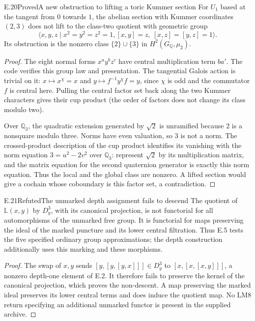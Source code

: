 \begin{statement}{E.20}{Proved}{A new obstruction to lifting a toric Kummer section}
For $U_1$ based at the tangent from $0$
towards $1$, the abelian section with
Kummer coordinates $(2,3)$ does not
lift to the class-two quotient with
geometric group
\[
 \langle x,y,z\mid x^2=y^2=z^2=1,
 [x,y]=z,\ [x,z]=[y,z]=1\rangle.
\]
Its obstruction is the nonzero class
$\{2\}\cup\{3\}$ in
$H^2(G_{\mathbb Q},\mu_2)$.
\end{statement}
\begin{proof}
The eight normal forms $x^a y^b z^c$
have central multiplication term
$b a'$. The code verifies this group
law and presentation. The tangential
Galois action is trivial on it:
$x\mapsto x^\chi=x$ and
$y\mapsto f^{-1}y^\chi f=y$, since
$\chi$ is odd and the commutator
$f$ is central here. Pulling the
central factor set back along the
two Kummer characters gives their
cup product (the order of factors
does not change its class modulo
two).

Over $\mathbb Q_3$, the quadratic
extension generated by $\sqrt2$ is
unramified because $2$ is a
nonsquare modulo three. Norms have
even valuation, so $3$ is not a
norm. The crossed-product
description of the cup product
identifies its vanishing with
the norm equation
$3=u^2-2v^2$ over $\mathbb Q_3$:
represent $\sqrt2$ by its
multiplication matrix, and the
matrix equation for the second
quaternion generator is exactly
this norm equation. Thus the
local and the global class are
nonzero. A lifted section would
give a cochain whose coboundary
is this factor set, a contradiction.
\end{proof}

\begin{statement}{E.21}{Refuted}{The unmarked depth assignment fails to descend}
The quotient of $\mathbb L(x,y)$
by $D_y^3$, with its canonical
projection, is not functorial for
all automorphisms of the unmarked
free group. It is functorial for
maps preserving the ideal of the
marked puncture and its lower
central filtration. Thus E.5
tests the five specified ordinary
group approximations; the depth
construction additionally uses
this marking and these morphisms.
\end{statement}
\begin{proof}
The swap of $x,y$ sends
$[y,[y,[y,x]]]\in D_y^3$ to
$[x,[x,[x,y]]]$, a nonzero
depth-one element of E.2.
It therefore fails to preserve
the kernel of the canonical
projection, which proves the
non-descent. A map preserving
the marked ideal preserves its
lower central terms and does
induce the quotient map.
No LM8 return specifying an
additional unmarked functor is
present in the supplied archive.
\end{proof}

